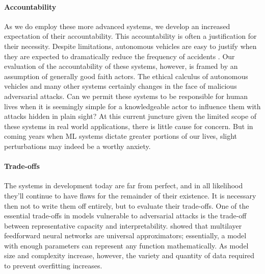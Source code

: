 \documentclass[]{article}
\begin{document}
\paragraph{Accountability} As we do employ these more advanced systems, we develop an increased expectation of their accountability. This accountability is often a justification for their necessity. Despite limitations, autonomous vehicles are easy to justify when they are expected to dramatically reduce the frequency of accidents \citep{blanco2016}. Our evaluation of the accountability of these systems, however, is framed by an assumption of generally good faith actors. The ethical calculus of autonomous vehicles and many other systems certainly changes in the face of malicious adversarial attacks. Can we permit these systems to be responsible for human lives when it is seemingly simple for a knowledgeable actor to influence them with attacks hidden in plain sight? At this current juncture given the limited scope of these systems in real world applications, there is little cause for concern. But in coming years when ML systems dictate greater portions of our lives, slight perturbations may indeed be a worthy anxiety.

\paragraph{Trade-offs} The systems in development today are far from perfect, and in all likelihood they'll continue to have flaws for the remainder of their existence. It is necessary then not to write them off entirely, but to evaluate their trade-offs. One of the essential trade-offs in models vulnerable to adversarial attacks is the trade-off between representative capacity and interpretability. \citet{hornik1991approximation} showed that multilayer feedforward neural networks are universal approximators; essentially, a model with enough parameters can represent any function mathematically. As model size and complexity increase, however, the variety and quantity of data required to prevent overfitting increases.
\end{document}
